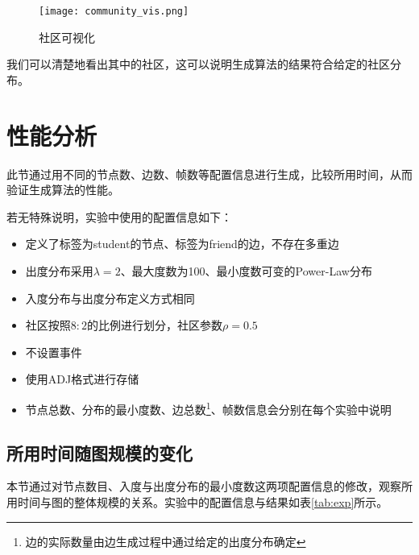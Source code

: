 \begin{figure}[H]
  \centering
  \texttt{[image: community\_vis.png]}
  \caption{社区可视化}
  \label{fig:community_vis}
\end{figure}

我们可以清楚地看出其中的社区，这可以说明生成算法的结果符合给定的社区分布。

\section{性能分析}

此节通过用不同的节点数、边数、帧数等配置信息进行生成，比较所用时间，从而验证生成算法的性能。

若无特殊说明，实验中使用的配置信息如下：

\begin{itemize}
  \item 定义了标签为student的节点、标签为friend的边，不存在多重边
  \item 出度分布采用$\lambda=2$、最大度数为100、最小度数可变的Power-Law分布
  \item 入度分布与出度分布定义方式相同
  \item 社区按照$8:2$的比例进行划分，社区参数$\rho=0.5$
  \item 不设置事件
  \item 使用ADJ格式进行存储
  \item 节点总数、分布的最小度数、边总数\footnote{边的实际数量由边生成过程中通过给定的出度分布确定}、帧数信息会分别在每个实验中说明
\end{itemize}

\subsection{所用时间随图规模的变化}

本节通过对节点数目、入度与出度分布的最小度数这两项配置信息的修改，观察所用时间与图的整体规模的关系。实验中的配置信息与结果如表\ref{tab:exp}所示。

